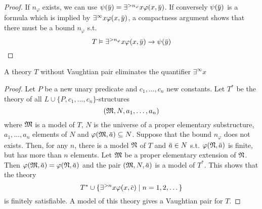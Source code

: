 \documentclass[11pt]{article}
\begin{document}
\begin{proof}
If \(n_\varphi\) exists, we can use \(\psi(\bary)=\exists^{>n_{\varphi}}x\varphi(x,\bary)\). If conversely \(\psi(\bary)\) is
a formula which is implied by \(\exists^\infty x\varphi(x,\bary)\), a compactness argument shows that there must
be a bound \(n_\varphi\) s.t.
\begin{equation*}
T\vDash\exists^{>n_\varphi}x\varphi(x,\bary)\to\psi(\bary)
\end{equation*}
\end{proof}

\begin{lemma}[]
\label{lemma5.5.7}
A theory \(T\) without Vaughtian pair eliminates the quantifier \(\exists^\infty x\)
\end{lemma}


\begin{proof}
Let \(P\) be a new unary predicate and \(c_1,\dots,c_n\) new constants. Let \(T^*\) be the theory
of all \(L\cup\{P,c_1,\dots,c_n\}\)-structures
\begin{equation*}
(\mathfrak{M},N,a_1,\dots,a_n)
\end{equation*}
where \(\mathfrak{M}\) is a model of \(T\), \(N\) is the universe of a proper elementary substructure,
 \(a_1,\dots,a_n\) elements of \(N\) and \(\varphi(\fM,\bara)\subseteq N\).
Suppose that the
bound \(n_\varphi\) does not exists. Then, for any \(n\), there is a model \(\mathfrak{N}\) of \(T\)
and \(\bara\in N\) s.t. \(\varphi(\fN,\bara)\) is finite, but has more than \(n\) elements. Let \(\mathfrak{M}\) be a
proper elementary extension of \(\mathfrak{N}\).
Then \(\varphi(\fM,\bara)=\varphi(\fN,\bara)\)
and the pair \((\fM,N,\bara)\) is a model of \(T^*\). This shows
that the theory
\begin{equation*}
T^*\cup\{\exists^{>n}x\varphi(x,\barc)\mid n=1,2,\dots\}
\end{equation*}
is finitely satisfiable. A model of this theory gives a Vaughtian pair for \(T\).
\end{proof}
\end{document}
